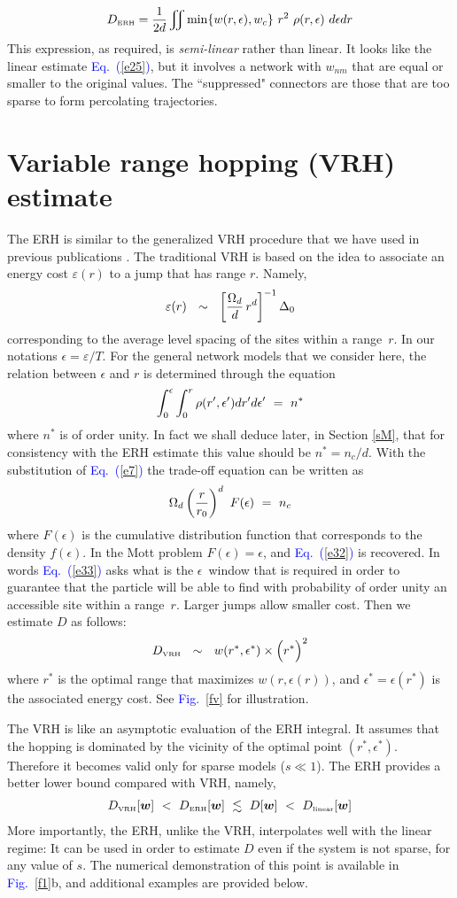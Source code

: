 \documentclass[onecolumn,fleqn,12pt,openany,draft]{book}
\newcommand{\tbox}[1]{\mbox{\tiny #1}}
\newcommand{\mylabel}[1]{\label{#1}}
\newcommand{\beq}{\begin{eqnarray}}
\newcommand{\eeq}{\end{eqnarray}}
\newcommand{\be}[1]{\begin{eqnarray}\ifthenelse{#1=-1}
{\nonumber}{\ifthenelse{#1=0}{}{\mylabel{e#1}}}}
\newcommand{\Eq}[1]{\textcolor{blue}{Eq.\!\!~(\ref{#1})}}
\newcommand{\Fig}[1]{\textcolor{blue}{Fig.}\!\!~\ref{#1}}
\begin{document}
%
\be{31}
D_{\tbox{ERH}} = \frac{1}{2d}\iint \min\{w(r,\epsilon),w_c\} \ r^2  \ \rho(r,\epsilon) \ d\epsilon dr
\eeq
%
This expression, as required, is {\em semi-linear} rather than linear. 
It looks like the linear estimate \Eq{e25}, but it involves a network 
with $w_{nm}$ that are equal or smaller to the original values.
The ``suppressed" connectors are those that are too sparse 
to form percolating trajectories. 


\section{Variable range hopping (VRH) estimate}

The ERH is similar to the generalized VRH procedure 
that we have used in previous publications \cite{kbd,kbw}.
The traditional VRH is based on the idea to associate
an energy cost $\varepsilon(r)$ to a jump that has range $r$. Namely,  
%
\be{32}
\varepsilon(r) \ \ \sim \ \ \left[\frac{\Omega_d}{d}\, r^d\right]^{-1} \Delta_0
\eeq
%  
corresponding to the average level spacing 
of the sites within a range~$r$. 
%
In our notations $\epsilon=\varepsilon/T$.  
For the general network models that we consider here,
the relation between $\epsilon$ and $r$ 
is determined through the equation 
%
\be{33}
\int_0^{\epsilon} \int_0^{r} \rho(r',\epsilon')  dr'd\epsilon' \  = \  n^* 
\eeq
%
where $n^*$ is of order unity. In fact we shall deduce later, 
in Section \ref{sM}, that for consistency with the ERH estimate 
this value should be $n^*=n_c/d$. With the substitution 
of \Eq{e7} the trade-off equation can be written as 
%
\be{34}
\Omega_d\left(\frac{r}{r_0}\right)^d \ F(\epsilon) \ = \ n_c
\eeq
%
where $F(\epsilon)$ is the cumulative distribution function 
that corresponds to the density $f(\epsilon)$.
In the Mott problem $F(\epsilon)=\epsilon$, and \Eq{e32} is recovered.
In words \Eq{e33} asks what is the $\epsilon$~window that 
is required in order to guarantee that the particle will be able 
to find with probability of order unity an accessible site within 
a range~$r$. Larger jumps allow smaller cost. 
Then we estimate $D$ as follows: 
%
\be{35}
D_{\tbox{VRH}}  \ \ \sim \ \ 
w(r^*,\epsilon^*) \times  \Big(r^*\Big)^2
\eeq
%
where $r^*$ is the optimal range that maximizes $w(r,\epsilon(r))$, 
and $\epsilon^*=\epsilon(r^*)$ is the associated energy cost. 
See \Fig{fv} for illustration.


The VRH is like an asymptotic evaluation of the ERH integral.
It assumes that the hopping is dominated 
by the vicinity of the optimal point ${(r^*,\epsilon^*)}$.
Therefore it becomes valid only for sparse models ($s\ll1$). 
The ERH provides a better lower bound compared with VRH, namely, 
%
\beq
D_{\tbox{VRH}}[\bm{w}]  
\ < \ D_{\tbox{ERH}}[\bm{w}]
\ \lesssim \ D[\bm{w}]
\ < \ D_{\tbox{linear}}[\bm{w}]
\eeq
%
More importantly, the ERH, unlike the VRH, 
interpolates well with the linear regime:  
It can be used in order to estimate $D$ 
even if the system is not sparse, for any value of $s$. 
The numerical demonstration of this point 
is available in \Fig{f1}b, and additional 
examples are provided below.  
\end{document}
